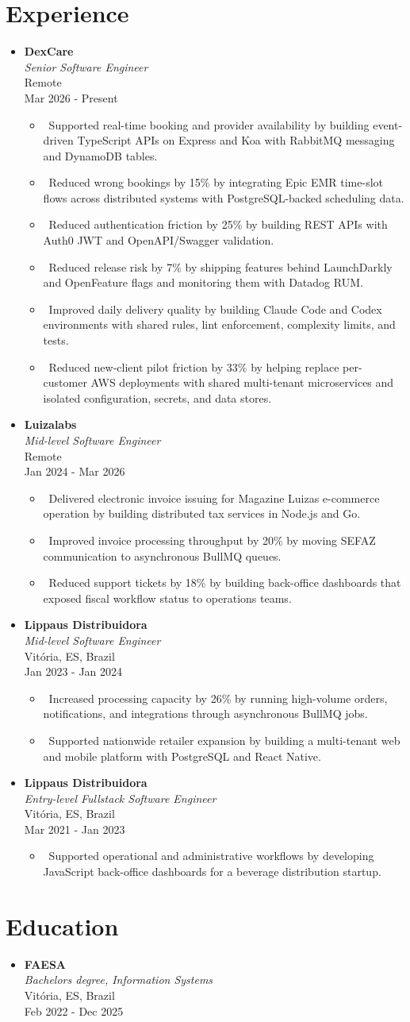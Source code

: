 \documentclass[letterpaper,10pt]{article}
\newcommand{\resumeItem}[1]{\item\small{#1}}
\newcommand{\resumeSubheading}[4]{
\item
  \textbf{#1} \\[-2pt]
  \textit{#3} \\[-2pt]
  #4 \\[-2pt]
  #2\vspace{2pt}
}
\newcommand{\resumeSubHeadingList}{\begin{itemize}[leftmargin=0.15in, label={}, nosep]}
\newcommand{\resumeSubHeadingListEnd}{\end{itemize}}
\newcommand{\resumeRoleGap}{\vspace{7pt}}
\begin{document}
\section{Experience}
\resumeSubHeadingList
  \resumeSubheading
      {DexCare}{Mar 2026 - Present}
      {Senior Software Engineer}{Remote}
      \resumeSubHeadingList
          \resumeItem{\textbullet\ Supported real-time booking and provider availability by building event-driven TypeScript APIs on Express and Koa with RabbitMQ messaging and DynamoDB tables.}
          \resumeItem{\textbullet\ Reduced wrong bookings by 15\% by integrating Epic EMR time-slot flows across distributed systems with PostgreSQL-backed scheduling data.}
          \resumeItem{\textbullet\ Reduced authentication friction by 25\% by building REST APIs with Auth0 JWT and OpenAPI/Swagger validation.}
          \resumeItem{\textbullet\ Reduced release risk by 7\% by shipping features behind LaunchDarkly and OpenFeature flags and monitoring them with Datadog RUM.}
          \resumeItem{\textbullet\ Improved daily delivery quality by building Claude Code and Codex environments with shared rules, lint enforcement, complexity limits, and tests.}
          \resumeItem{\textbullet\ Reduced new-client pilot friction by 33\% by helping replace per-customer AWS deployments with shared multi-tenant microservices and isolated configuration, secrets, and data stores.}
      \resumeSubHeadingListEnd
  \resumeRoleGap
  \resumeSubheading
      {Luizalabs}{Jan 2024 - Mar 2026}
      {Mid-level Software Engineer}{Remote}
      \resumeSubHeadingList
          \resumeItem{\textbullet\ Delivered electronic invoice issuing for Magazine Luiza\textquotesingle{}s e-commerce operation by building distributed tax services in Node.js and Go.}
          \resumeItem{\textbullet\ Improved invoice processing throughput by 20\% by moving SEFAZ communication to asynchronous BullMQ queues.}
          \resumeItem{\textbullet\ Reduced support tickets by 18\% by building back-office dashboards that exposed fiscal workflow status to operations teams.}
      \resumeSubHeadingListEnd
  \resumeRoleGap
  \resumeSubheading
      {Lippaus Distribuidora}{Jan 2023 - Jan 2024}
      {Mid-level Software Engineer}{Vit\'oria, ES, Brazil}
      \resumeSubHeadingList
          \resumeItem{\textbullet\ Increased processing capacity by 26\% by running high-volume orders, notifications, and integrations through asynchronous BullMQ jobs.}
          \resumeItem{\textbullet\ Supported nationwide retailer expansion by building a multi-tenant web and mobile platform with PostgreSQL and React Native.}
      \resumeSubHeadingListEnd
  \resumeRoleGap
  \resumeSubheading
      {Lippaus Distribuidora}{Mar 2021 - Jan 2023}
      {Entry-level Fullstack Software Engineer}{Vit\'oria, ES, Brazil}
      \resumeSubHeadingList
          \resumeItem{\textbullet\ Supported operational and administrative workflows by developing JavaScript back-office dashboards for a beverage distribution startup.}
      \resumeSubHeadingListEnd
\resumeSubHeadingListEnd

\resumeRoleGap
\section{Education}
\resumeSubHeadingList
  \resumeSubheading
      {FAESA}{Feb 2022 - Dec 2025}
      {Bachelor\textquotesingle{}s degree, Information Systems}{Vit\'oria, ES, Brazil}
\resumeSubHeadingListEnd
\end{document}
